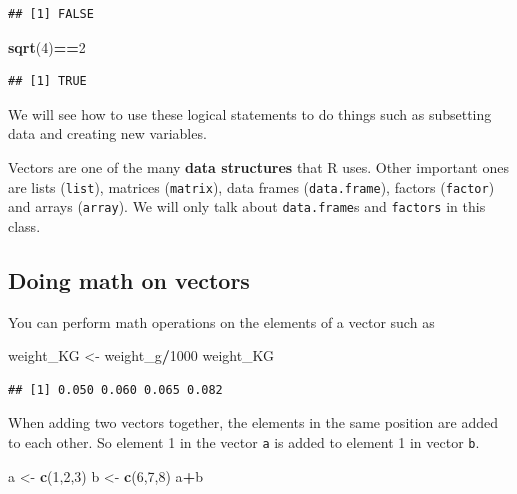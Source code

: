 \documentclass[
]{article}
\newenvironment{Shaded}{\begin{snugshade}}{\end{snugshade}}
\newcommand{\DecValTok}[1]{\textcolor[rgb]{0.00,0.00,0.81}{#1}}
\newcommand{\KeywordTok}[1]{\textcolor[rgb]{0.13,0.29,0.53}{\textbf{#1}}}
\newcommand{\NormalTok}[1]{#1}
\newcommand{\OperatorTok}[1]{\textcolor[rgb]{0.81,0.36,0.00}{\textbf{#1}}}
\newcommand{\StringTok}[1]{\textcolor[rgb]{0.31,0.60,0.02}{#1}}
\begin{document}
\begin{verbatim}
## [1] FALSE
\end{verbatim}

\begin{Shaded}
\begin{Highlighting}[]
\KeywordTok{sqrt}\NormalTok{(}\DecValTok{4}\NormalTok{)}\OperatorTok{==}\DecValTok{2}
\end{Highlighting}
\end{Shaded}

\begin{verbatim}
## [1] TRUE
\end{verbatim}

We will see how to use these logical statements to do things such as
subsetting data and creating new variables.

Vectors are one of the many \textbf{data structures} that R uses. Other
important ones are lists (\texttt{list}), matrices (\texttt{matrix}),
data frames (\texttt{data.frame}), factors (\texttt{factor}) and arrays
(\texttt{array}). We will only talk about \texttt{data.frame}s and
\texttt{factors} in this class.

\hypertarget{doing-math-on-vectors}{%
\subsection{Doing math on vectors}\label{doing-math-on-vectors}}

You can perform math operations on the elements of a vector such as

\begin{Shaded}
\begin{Highlighting}[]
\NormalTok{weight_KG <-}\StringTok{ }\NormalTok{weight_g}\OperatorTok{/}\DecValTok{1000}
\NormalTok{weight_KG}
\end{Highlighting}
\end{Shaded}

\begin{verbatim}
## [1] 0.050 0.060 0.065 0.082
\end{verbatim}

When adding two vectors together, the elements in the same position are
added to each other. So element 1 in the vector \texttt{a} is added to
element 1 in vector \texttt{b}.

\begin{Shaded}
\begin{Highlighting}[]
\NormalTok{a <-}\StringTok{ }\KeywordTok{c}\NormalTok{(}\DecValTok{1}\NormalTok{,}\DecValTok{2}\NormalTok{,}\DecValTok{3}\NormalTok{)}
\NormalTok{b <-}\StringTok{ }\KeywordTok{c}\NormalTok{(}\DecValTok{6}\NormalTok{,}\DecValTok{7}\NormalTok{,}\DecValTok{8}\NormalTok{)}
\NormalTok{a}\OperatorTok{+}\NormalTok{b}
\end{Highlighting}
\end{Shaded}
\end{document}
